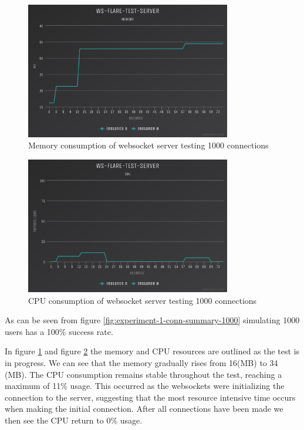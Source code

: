 \begin{figure}[H]
  \centering
    \includegraphics[width=0.8\textwidth]{figures/experiments/experiment-1/node-js/memory-1000.png}
    \caption{Memory consumption of websocket server testing 1000 connections}
    \label{fig:experiment-1-memory-1000}
\end{figure}

\begin{figure}[H]
  \centering
    \includegraphics[width=0.8\textwidth]{figures/experiments/experiment-1/node-js/cpu-1000.png}
    \caption{CPU consumption of websocket server testing 1000 connections}
    \label{fig:experiment-1-cpu-1000}
\end{figure}

As can be seen from figure \ref{fig:experiment-1-conn-summary-1000} simulating 1000 users has a 100\% success rate.

In figure \ref{fig:experiment-1-memory-1000} and figure \ref{fig:experiment-1-cpu-1000} the memory and CPU resources are outlined as the test is in progress. We can see that the memory gradually rises from 16(MB) to 34 (MB). The CPU consumption remains stable throughout the test, reaching a maximum of 11\% usage. This occurred as the websockets were initializing the connection to the server, suggesting that the most resource intensive time occurs when making the initial connection. After all connections have been made we then see the CPU return to 0\% usage. 

